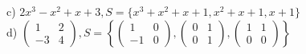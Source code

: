 \documentclass[letterpaper]{article}
\renewcommand{\*}{\cdot}
\theoremstyle{definition}
\begin{document}
c) $2x^3 - x^2 + x + 3, S =  \lbrace x^3 + x^2 + x +1, x^2 + x +1, x +1 \rbrace$\\


d) $ \begin{pmatrix} 1 & 2 \\ -3 & 4 \end{pmatrix},  S =  \left \lbrace \begin{pmatrix} 1 & 0 \\ -1 & 0 \end{pmatrix} , \begin{pmatrix} 0 & 1 \\ 0 &1 \end{pmatrix} , \begin{pmatrix} 1 & 1 \\ 0 &0 \end{pmatrix} \right \rbrace$

	
\end{document}
